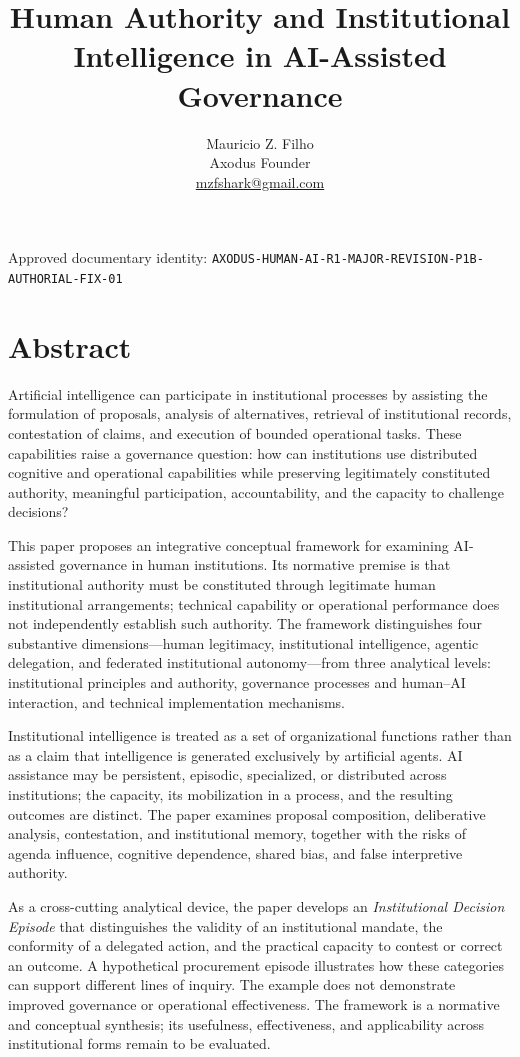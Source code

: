 \documentclass[
  10pt,
]{article}
\title{Human Authority and Institutional Intelligence in AI-Assisted
Governance}
\author{Mauricio Z. Filho\\\small Axodus Founder\\\small \href{mailto:mzfshark@gmail.com}{mzfshark@gmail.com}}
\date{}
\begin{document}
\maketitle
\begin{center}\footnotesize Approved documentary identity: \texttt{AXODUS-HUMAN-AI-R1-MAJOR-REVISION-P1B-AUTHORIAL-FIX-01}\end{center}

\section{Abstract}\label{abstract}

Artificial intelligence can participate in institutional processes by
assisting the formulation of proposals, analysis of alternatives,
retrieval of institutional records, contestation of claims, and
execution of bounded operational tasks. These capabilities raise a
governance question: how can institutions use distributed cognitive and
operational capabilities while preserving legitimately constituted
authority, meaningful participation, accountability, and the capacity to
challenge decisions?

This paper proposes an integrative conceptual framework for examining
AI-assisted governance in human institutions. Its normative premise is
that institutional authority must be constituted through legitimate
human institutional arrangements; technical capability or operational
performance does not independently establish such authority. The
framework distinguishes four substantive dimensions---human legitimacy,
institutional intelligence, agentic delegation, and federated
institutional autonomy---from three analytical levels: institutional
principles and authority, governance processes and human--AI
interaction, and technical implementation mechanisms.

Institutional intelligence is treated as a set of organizational
functions rather than as a claim that intelligence is generated
exclusively by artificial agents. AI assistance may be persistent,
episodic, specialized, or distributed across institutions; the capacity,
its mobilization in a process, and the resulting outcomes are distinct.
The paper examines proposal composition, deliberative analysis,
contestation, and institutional memory, together with the risks of
agenda influence, cognitive dependence, shared bias, and false
interpretive authority.

As a cross-cutting analytical device, the paper develops an
\emph{Institutional Decision Episode} that distinguishes the validity of
an institutional mandate, the conformity of a delegated action, and the
practical capacity to contest or correct an outcome. A hypothetical
procurement episode illustrates how these categories can support
different lines of inquiry. The example does not demonstrate improved
governance or operational effectiveness. The framework is a normative
and conceptual synthesis; its usefulness, effectiveness, and
applicability across institutional forms remain to be evaluated.
\end{document}
